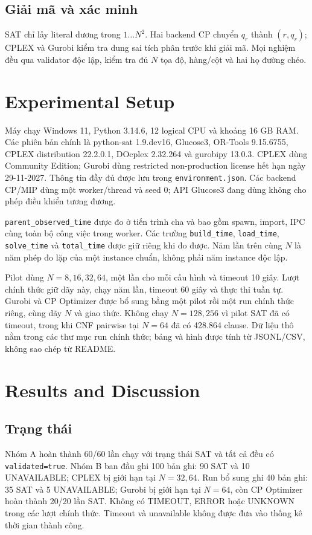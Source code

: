 \documentclass[a4paper,fleqn]{cas-sc}
\begin{document}
\subsection{Giải mã và xác minh}
SAT chỉ lấy literal dương trong $1\ldots N^2$. Hai backend CP chuyển $q_r$ thành $(r,q_r)$; CPLEX và Gurobi kiểm tra dung sai tích phân trước khi giải mã. Mọi nghiệm đều qua validator độc lập, kiểm tra đủ $N$ tọa độ, hàng/cột và hai họ đường chéo.

\section{Experimental Setup}
Máy chạy Windows 11, Python 3.14.6, 12 logical CPU và khoảng 16 GB RAM. Các phiên bản chính là python-sat 1.9.dev16, Glucose3, OR-Tools 9.15.6755, CPLEX distribution 22.2.0.1, DOcplex 2.32.264 và gurobipy 13.0.3. CPLEX dùng Community Edition; Gurobi dùng restricted non-production license hết hạn ngày 29-11-2027. Thông tin đầy đủ được lưu trong \texttt{environment.json}. Các backend CP/MIP dùng một worker/thread và seed 0; API Glucose3 đang dùng không cho phép điều khiển tương đương.

\texttt{parent\_observed\_time} được đo ở tiến trình cha và bao gồm spawn, import, IPC cùng toàn bộ công việc trong worker. Các trường \texttt{build\_time}, \texttt{load\_time}, \texttt{solve\_time} và \texttt{total\_time} được giữ riêng khi đo được. Năm lần trên cùng $N$ là năm phép đo lặp của một instance chuẩn, không phải năm instance độc lập.

Pilot dùng $N=8,16,32,64$, một lần cho mỗi cấu hình và timeout 10 giây. Lượt chính thức giữ dãy này, chạy năm lần, timeout 60 giây và thực thi tuần tự. Gurobi và CP Optimizer được bổ sung bằng một pilot rồi một run chính thức riêng, cùng dãy $N$ và giao thức. Không chạy $N=128,256$ vì pilot SAT đã có timeout, trong khi CNF pairwise tại $N=64$ đã có 428.864 clause. Dữ liệu thô nằm trong các thư mục run chính thức; bảng và hình được tính từ JSONL/CSV, không sao chép từ README.

\section{Results and Discussion}
\subsection{Trạng thái}
Nhóm A hoàn thành 60/60 lần chạy với trạng thái SAT và tất cả đều có \texttt{validated=true}. Nhóm B ban đầu ghi 100 bản ghi: 90 SAT và 10 UNAVAILABLE; CPLEX bị giới hạn tại $N=32,64$. Run bổ sung ghi 40 bản ghi: 35 SAT và 5 UNAVAILABLE; Gurobi bị giới hạn tại $N=64$, còn CP Optimizer hoàn thành 20/20 lần SAT. Không có TIMEOUT, ERROR hoặc UNKNOWN trong các lượt chính thức. Timeout và unavailable không được đưa vào thống kê thời gian thành công.
\end{document}

